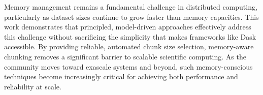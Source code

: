 Memory management remains a fundamental challenge in distributed computing, particularly as dataset sizes continue to grow faster than memory capacities.
This work demonstrates that principled, model-driven approaches effectively address this challenge without sacrificing the simplicity that makes frameworks like Dask accessible.
By providing reliable, automated chunk size selection, memory-aware chunking removes a significant barrier to scalable scientific computing.
As the community moves toward exascale systems and beyond, such memory-conscious techniques become increasingly critical for achieving both performance and reliability at scale.